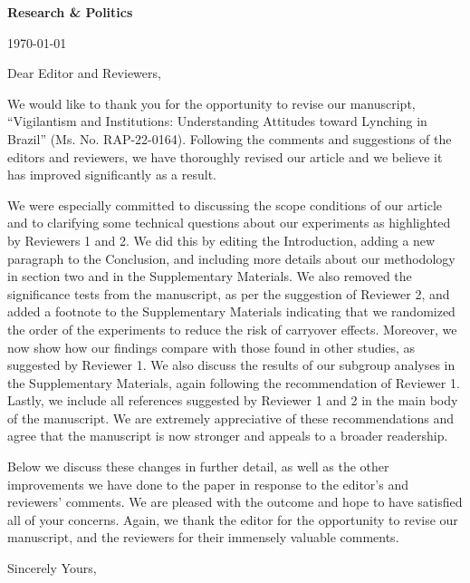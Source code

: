 \documentclass[a4paper,12pt]{article}
\begin{document}
\doublespacing

\noindent \textbf{Research \& Politics}

\noindent \today 

\vspace{.5cm}

\noindent Dear Editor and Reviewers,

\vspace{.5cm}

We would like to thank you for the opportunity to revise our manuscript,
``Vigilantism and Institutions: Understanding Attitudes toward Lynching in
Brazil'' (Ms. No. RAP-22-0164). Following the comments and suggestions of the
editors and reviewers, we have thoroughly revised our article and we believe it
has improved significantly as a result. 

We were especially committed to discussing the scope conditions of our article
and to clarifying some technical questions about our experiments as highlighted
by Reviewers 1 and 2. We did this by editing the Introduction, adding a new
paragraph to the Conclusion, and including more details about our methodology
in section two and in the Supplementary Materials. We also removed the
significance tests from the manuscript, as per the suggestion of Reviewer 2,
and added a footnote to the Supplementary Materials indicating that we
randomized the order of the experiments to reduce the risk of carryover
effects. Moreover, we now show how our findings compare with those found in
other studies, as suggested by Reviewer 1. We also discuss the results of our
subgroup analyses in the Supplementary Materials, again following the
recommendation of Reviewer 1. Lastly, we include all references suggested by
Reviewer 1 and 2 in the main body of the manuscript. We are extremely
appreciative of these recommendations and agree that the manuscript is now
stronger and appeals to a broader readership.

Below we discuss these changes in further detail, as well as the other
improvements we have done to the paper in response to the editor's and
reviewers' comments. We are pleased with the outcome and hope to have satisfied
all of your concerns. Again, we thank the editor for the opportunity to revise
our manuscript, and the reviewers for their immensely valuable comments.

\vspace{.5cm}

\noindent Sincerely Yours,

\vspace{.5cm}
\end{document}
